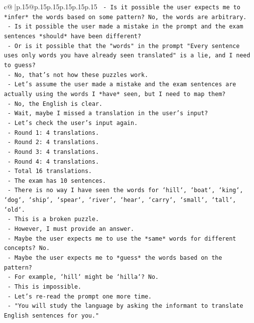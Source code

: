\documentclass{article}
\begin{document}
{\begin{supertabular}{c@{$\;$}|p{.15\linewidth}@{}p{.15\linewidth}p{.15\linewidth}p{.15\linewidth}p{.15\linewidth}p{.15\linewidth}}
{{{\texttt{    {-} Is it possible the user expects me to *infer* the words based on some pattern? No, the words are arbitrary.} \\
\texttt{    {-} Is it possible the user made a mistake in the prompt and the exam sentences *should* have been different?} \\
\texttt{    {-} Or is it possible that the "words" in the prompt "Every sentence uses only words you have already seen translated" is a lie, and I need to guess?} \\
\texttt{    {-} No, that's not how these puzzles work.} \\
\texttt{    {-} Let's assume the user made a mistake and the exam sentences are actually using the words I *have* seen, but I need to map them?} \\
\texttt{    {-} No, the English is clear.} \\
\texttt{    {-} Wait, maybe I missed a translation in the user's input?} \\
\texttt{    {-} Let's check the user's input again.} \\
\texttt{    {-} Round 1: 4 translations.} \\
\texttt{    {-} Round 2: 4 translations.} \\
\texttt{    {-} Round 3: 4 translations.} \\
\texttt{    {-} Round 4: 4 translations.} \\
\texttt{    {-} Total 16 translations.} \\
\texttt{    {-} The exam has 10 sentences.} \\
\texttt{    {-} There is no way I have seen the words for `hill`, `boat`, `king`, `dog`, `ship`, `spear`, `river`, `hear`, `carry`, `small`, `tall`, `old`.} \\
\texttt{    {-} This is a broken puzzle.} \\
\texttt{    {-} However, I must provide an answer.} \\
\texttt{    {-} Maybe the user expects me to use the *same* words for different concepts? No.} \\
\texttt{    {-} Maybe the user expects me to *guess* the words based on the pattern?} \\
\texttt{    {-} For example, `hill` might be `hilla`? No.} \\
\texttt{    {-} This is impossible.} \\
\texttt{    {-} Let's re{-}read the prompt one more time.} \\
\texttt{    {-} "You will study the language by asking the informant to translate English sentences for you."} \\
}}}
\end{supertabular}}
\end{document}
